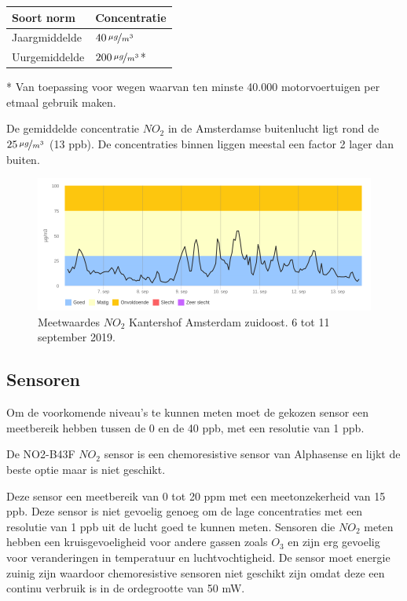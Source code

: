 \documentclass[a4paper, 11pt]{article} %
\begin{document}
\begin{center}
	\begin{tabular}{ | m{5cm} | m{5cm}| } 
		\hline
		Soort norm & Concentratie \\
		\hline
		Jaargmiddelde & $40\,\nicefrac{\mu g}{m^{3}}$
		\\ 
		\hline
		Uurgemiddelde & $200\,\nicefrac{\mu g}{m^{3}}$* 
		\\ 
		\hline
	\end{tabular}
\end{center}

\begin{footnotesize} 
* Van toepassing voor wegen waarvan ten minste 40.000 motorvoertuigen per etmaal gebruik maken.
\end{footnotesize}

De gemiddelde concentratie $NO_2$ in de Amsterdamse buitenlucht ligt rond de $25\,\nicefrac{\mu g}{m^{3}}$ (13 ppb). De concentraties binnen liggen meestal een factor 2 lager dan buiten. 

\begin{figure}
    \centering
    \includegraphics[width=.9\linewidth]{amsterdam.png}
    \caption{Meetwaardes $NO_2$ Kantershof Amsterdam zuidoost. 6 tot 11 september 2019.}
    \label{fig:grafiek}
\end{figure}

\subsection{Sensoren}


Om de voorkomende niveau's te kunnen meten moet de gekozen sensor een meetbereik hebben tussen de 0 en de 40 ppb, met een resolutie van 1 ppb. 

De NO2-B43F $NO_2$ sensor is een chemoresistive sensor van Alphasense en lijkt de beste optie maar is niet geschikt.

Deze sensor een meetbereik van 0 tot 20 ppm met een meetonzekerheid van 15 ppb. Deze sensor is niet gevoelig genoeg om de lage concentraties met een resolutie van 1 ppb uit de lucht goed te kunnen meten. 
Sensoren die $NO_2$ meten hebben een kruisgevoeligheid voor andere gassen zoals $O_3$ en zijn erg gevoelig voor veranderingen in temperatuur en luchtvochtigheid. 
De sensor moet energie zuinig zijn waardoor chemoresistive sensoren niet geschikt zijn omdat deze een continu verbruik is in de ordegrootte van 50 mW. 
\end{document}

